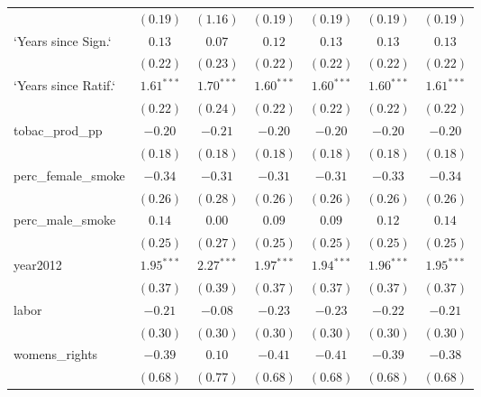 \begin{table}[!h]
\begin{center}
\begin{tabular}{l c c c c c c }
                        & $(0.19)$     & $(1.16)$     & $(0.19)$     & $(0.19)$     & $(0.19)$     & $(0.19)$     \\
`Years since Sign.`     & $0.13$       & $0.07$       & $0.12$       & $0.13$       & $0.13$       & $0.13$       \\
                        & $(0.22)$     & $(0.23)$     & $(0.22)$     & $(0.22)$     & $(0.22)$     & $(0.22)$     \\
`Years since Ratif.`    & $1.61^{***}$ & $1.70^{***}$ & $1.60^{***}$ & $1.60^{***}$ & $1.60^{***}$ & $1.61^{***}$ \\
                        & $(0.22)$     & $(0.24)$     & $(0.22)$     & $(0.22)$     & $(0.22)$     & $(0.22)$     \\
tobac\_prod\_pp         & $-0.20$      & $-0.21$      & $-0.20$      & $-0.20$      & $-0.20$      & $-0.20$      \\
                        & $(0.18)$     & $(0.18)$     & $(0.18)$     & $(0.18)$     & $(0.18)$     & $(0.18)$     \\
perc\_female\_smoke     & $-0.34$      & $-0.31$      & $-0.31$      & $-0.31$      & $-0.33$      & $-0.34$      \\
                        & $(0.26)$     & $(0.28)$     & $(0.26)$     & $(0.26)$     & $(0.26)$     & $(0.26)$     \\
perc\_male\_smoke       & $0.14$       & $0.00$       & $0.09$       & $0.09$       & $0.12$       & $0.14$       \\
                        & $(0.25)$     & $(0.27)$     & $(0.25)$     & $(0.25)$     & $(0.25)$     & $(0.25)$     \\
year2012                & $1.95^{***}$ & $2.27^{***}$ & $1.97^{***}$ & $1.94^{***}$ & $1.96^{***}$ & $1.95^{***}$ \\
                        & $(0.37)$     & $(0.39)$     & $(0.37)$     & $(0.37)$     & $(0.37)$     & $(0.37)$     \\
labor                   & $-0.21$      & $-0.08$      & $-0.23$      & $-0.23$      & $-0.22$      & $-0.21$      \\
                        & $(0.30)$     & $(0.30)$     & $(0.30)$     & $(0.30)$     & $(0.30)$     & $(0.30)$     \\
womens\_rights          & $-0.39$      & $0.10$       & $-0.41$      & $-0.41$      & $-0.39$      & $-0.38$      \\
                        & $(0.68)$     & $(0.77)$     & $(0.68)$     & $(0.68)$     & $(0.68)$     & $(0.68)$     \\

\end{tabular}
\end{center}
\end{table}
